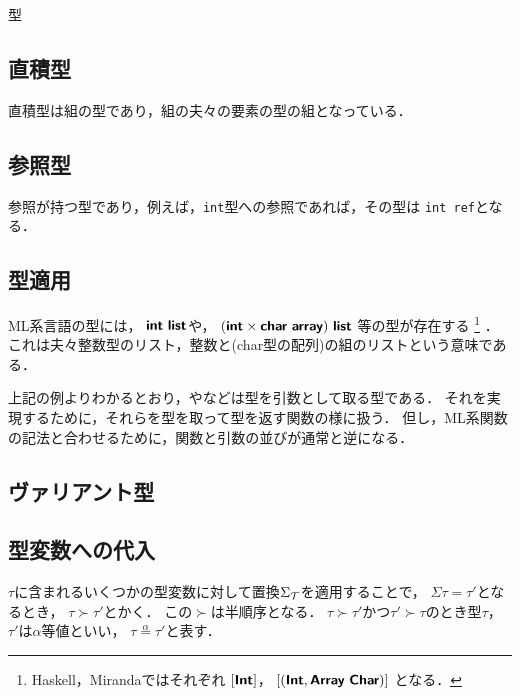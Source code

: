 \documentclass[a4paper,titlepage,report,disablejfam]{jsbook}
\begin{document}
\begin{resbonsiblesection}{型}{\sakamoto}
\subsection{直積型}\label{ssc:type-tuple}
直積型は組の型であり，組の夫々の要素の型の組となっている．

\subsection{参照型}\label{ssc:type-reference}
参照が持つ型であり，例えば，\lstinline|int|型への参照であれば，その型は
\lstinline|int ref|となる．

\subsection{型適用}\label{ssc:type-apply}
ML系言語の型には，
$\typename{int}\ \typename{list}$や，
$(\typename{int}\times\typename{char}\ \typename{array})\ \typename{list}$
等の型が存在する
\footnote{
    Haskell，Mirandaではそれぞれ
    $[\text{\sffamily\bfseries Int}]$，
    $[(\typename{Int}, \typename{Array}\ \typename{Char})]$
    となる．
    }
．
これは夫々整数型のリスト，整数と(char型の配列)の組のリストという意味である．

上記の例よりわかるとおり，やなどは型を引数として取る型である．
それを実現するために，それらを型を取って型を返す関数の様に扱う．
但し，ML系関数の記法と合わせるために，関数と引数の並びが通常と逆になる．

\subsection{ヴァリアント型}\label{ssc:type-variant}


\subsection{型変数への代入}\label{ssc:type-order}
$\tau$に含まれるいくつかの型変数に対して置換${\Sigma_{\mathcal{T}}}$を適用することで，
$\Sigma\tau=\tau'$となるとき，
$\tau\succ\tau'$とかく．
この$\succ$は半順序となる．
$\tau\succ\tau'$かつ$\tau'\succ\tau$のとき型$\tau$，$\tau'$は$\alpha$等値といい，
$\tau\mathrel{\overset{\alpha}{=}}\tau'$と表す．
\end{resbonsiblesection}
\end{document}

